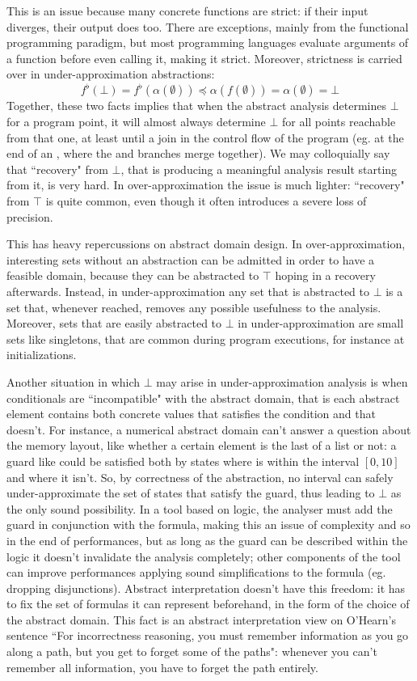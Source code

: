 This is an issue because many concrete functions are strict: if their input diverges, their output does too. There are exceptions, mainly from the functional programming paradigm, but most programming languages evaluate arguments of a function before even calling it, making it strict. Moreover, strictness is carried over in under-approximation abstractions:
\[
f^{\flat}(\bot) = f^{\flat}(\alpha(\emptyset)) \preceq \alpha(f(\emptyset)) = \alpha(\emptyset) = \bot
\]
Together, these two facts implies that when the abstract analysis determines $\bot$ for a program point, it will almost always determine $\bot$ for all points reachable from that one, at least until a join in the control flow of the program (eg. at the end of an , where the  and  branches merge together). We may colloquially say that ``recovery" from $\bot$, that is producing a meaningful analysis result starting from it, is very hard.
In over-approximation the issue is much lighter: ``recovery" from $\top$ is quite common, even though it often introduces a severe loss of precision.

This has heavy repercussions on abstract domain design. In over-approximation, interesting sets without an abstraction can be admitted in order to have a feasible domain, because they can be abstracted to $\top$ hoping in a recovery afterwards. Instead, in under-approximation any set that is abstracted to $\bot$ is a set that, whenever reached, removes any possible usefulness to the analysis.
Moreover, sets that are easily abstracted to $\bot$ in under-approximation are small sets like singletons, that are common during program executions, for instance at initializations.

Another situation in which $\bot$ may arise in under-approximation analysis is when conditionals are ``incompatible" with the abstract domain, that is each abstract element contains both concrete values that satisfies the condition and that doesn't.
For instance, a numerical abstract domain can't answer a question about the memory layout, like whether a certain element is the last of a list or not: a guard like  could be satisfied both by states where  is within the interval $[0, 10]$ and where it isn't. So, by correctness of the abstraction, no interval can safely under-approximate the set of states that satisfy the guard, thus leading to $\bot$ as the only sound possibility.
In a tool based on logic, the analyser must add the guard in conjunction with the formula, making this an issue of complexity and so in the end of performances, but as long as the guard can be described within the logic it doesn't invalidate the analysis completely; other components of the tool can improve performances applying sound simplifications to the formula (eg. dropping disjunctions).
Abstract interpretation doesn't have this freedom: it has to fix the set of formulas it can represent beforehand, in the form of the choice of the abstract domain. This fact is an abstract interpretation view on O'Hearn's sentence \cite{ohearn-incorrectness-logic} ``For incorrectness reasoning, you must remember information as you go along a path, but you get to forget some of the paths": whenever you can't remember all information, you have to forget the path entirely.

